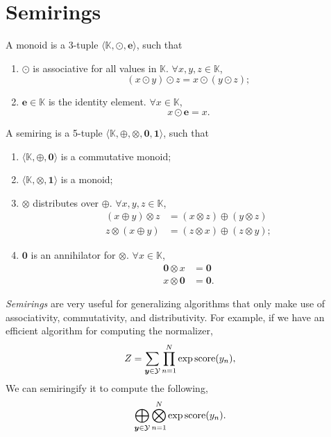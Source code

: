 \section{Semirings} \label{sec:semirings}

\begin{definition}[Monoid]
  A monoid is a 3-tuple $\langle \mathbb{K},\odot,\bm{e} \rangle$, such that
  \begin{enumerate}
    \item $\odot$ is associative for all values in $\mathbb{K}$. $\forall x,y,z
      \in \mathbb{K}$, \[
        (x\odot y)\odot z = x\odot (y\odot z)
      ;\]
  \item $\bm{e}\in \mathbb{K}$ is the identity element. $\forall x \in
    \mathbb{K}$, \[
        x \odot \bm{e} = x
      .\] 
  \end{enumerate}
\end{definition}

\begin{definition}[Semiring]
  A semiring is a 5-tuple $\langle \mathbb{K},\oplus,\otimes,\bm{0},\bm{1}
  \rangle$, such that
  \begin{enumerate}
    \item $\langle \mathbb{K},\oplus,\bm{0} \rangle$ is a commutative monoid;
    \item $\langle \mathbb{K},\otimes,\bm{1} \rangle$ is a monoid;
    \item $\otimes$ distributes over $\oplus$. $\forall x,y,z\in \mathbb{K}$,
      \begin{align*}
        (x\oplus y) \otimes z &= (x\otimes z) \oplus (y \otimes z) \\
        z\otimes (x \oplus y) &= (z\otimes x) \oplus (z\otimes y)
      ;\end{align*}
    \item $\bm{0}$ is an annihilator for $\otimes$. $\forall x \in \mathbb{K}$,
      \begin{align*}
        \bm{0} \otimes x &= \bm{0} \\
        x \otimes \bm{0} &= \bm{0}
      .\end{align*}
  \end{enumerate}
\end{definition}

\textit{Semirings} are very useful for generalizing algorithms that only make use of
associativity, commutativity, and distributivity. For example, if we have an
efficient algorithm for computing the normalizer, \[
  Z = \sum_{\bm{y}\in\mathcal{Y}} \prod_{n=1}^N \exp \mathrm{score}(y_n)
,\]
We can semiringify it to compute the following, \[
  \bigoplus_{\bm{y}\in\mathcal{Y}} \bigotimes_{n=1}^N \exp \mathrm{score}(y_n)
.\]

